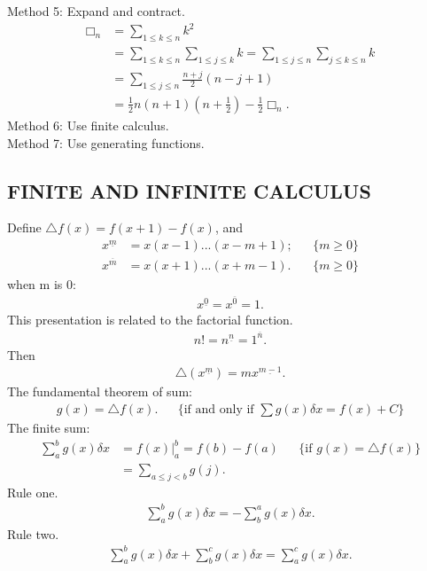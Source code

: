 \documentclass{article}
\begin{document}
Method 5: Expand and contract.
\begin{align}
\Box_n &= \sum_{1 \le k \le n} {k^2} \\
       &= \sum_{1 \le k \le n} \sum_{1 \le j \le k} k = \sum_{1 \le j \le n} \sum_{j \le k \le n} k \\
       &= \sum_{1 \le j \le n} \frac{n + j}{2}(n-j+1)\\
       &= \frac{1}{2}n(n+1)(n+\frac{1}{2}) - \frac{1}{2}\Box_n.
\end{align}
Method 6: Use finite calculus.\\
Method 7: Use generating functions.

\subsection{FINITE AND INFINITE CALCULUS}
Define $\bigtriangleup f(x) = f(x+1) - f(x)$, and
\begin{align}
x^{\underline {m}} &= x(x-1) ... (x-m+1); && \{m \ge 0\}\\
x^{\overline {m}} &= x(x+1) ... (x+m-1). && \{m \ge 0\}
\end{align}
when m is 0:
\begin{align}
x^{\underline 0} = x^{\overline 0} = 1.
\end{align}
This presentation is related to the factorial function.
\begin{align}
n! = n^{\underline n} = 1^{\overline n}.
\end{align}
Then
\begin{align}
\bigtriangleup (x^{\underline m}) = m x^{\underline {m-1}}.
\end{align}
The fundamental theorem of sum:
\begin{align}
g(x) = \bigtriangleup f(x). && \{\text{if and only if } \sum {g(x) \delta x} = f(x) + C\}
\end{align}
The finite sum:
\begin{align}
\sum\nolimits_{a}^{b}g(x)\delta x &= f(x)\big|_a^b = f(b) - f(a) && \{\text{if } g(x) = \bigtriangleup f(x)\}\\
                         &= \sum\nolimits_{a \le j < b} g(j).
\end{align}
Rule one.
\begin{align}
\sum\nolimits_{a}^{b}g(x)\delta x = -\sum\nolimits_{b}^{a}g(x)\delta x.
\end{align}
Rule two.
\begin{align}
\sum\nolimits_{a}^{b}g(x)\delta x +  \sum\nolimits_{b}^{c}g(x)\delta x = \sum\nolimits_{a}^{c}g(x)\delta x.
\end{align}
\end{document}
